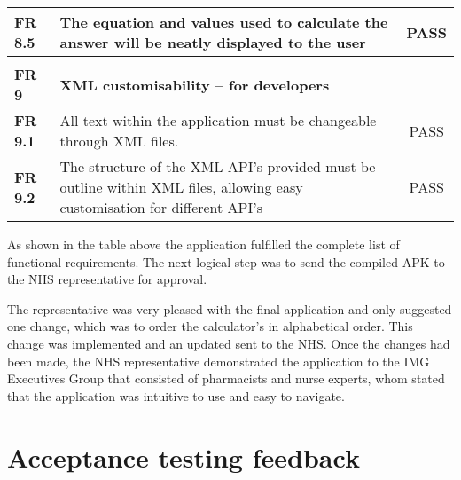 \begin{center}
\begin{longtable}{| l | p{11cm} | c |}
\textbf{FR 8.5}                 & The equation and values used to calculate the answer will be neatly displayed to the user                                                                                  & PASS      \\ \hline
\textbf{}                       &                                                                                                                                                                            &           \\ \hline
\textbf{FR 9}                   & \textbf{XML customisability – for developers}                                                                                                                              &           \\ \hline
\textbf{FR 9.1}                 & All text within the application must be changeable through XML files.                                                                                                      & PASS      \\ \hline
\textbf{FR 9.2}                 & The structure of the XML API’s provided must be outline within XML files, allowing easy customisation for different API’s                                                  & PASS      \\ \hline
\end{longtable}
\end{center}

As shown in the table above the application fulfilled the complete list of functional requirements. The next logical step was to send the compiled APK to the NHS representative for approval.

The representative was very pleased with the final application and only suggested one change, which was to order the calculator’s in alphabetical order. This change was implemented and an updated sent to the NHS. Once the changes had been made, the NHS representative demonstrated the application to the IMG Executives Group that consisted of pharmacists and nurse experts, whom stated that the application was intuitive to use and easy to navigate.
 
\section{Acceptance testing feedback}

